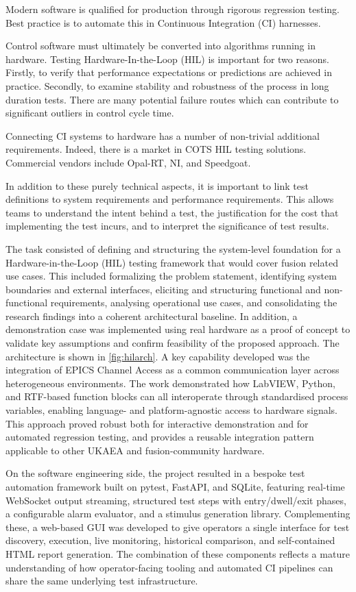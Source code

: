 \documentclass[preprint]{elsarticle}
\begin{document}
Modern software is qualified for production through rigorous regression testing.
Best practice is to automate this in Continuous Integration (CI) harnesses.

Control software must ultimately be converted into algorithms running in hardware.
Testing Hardware-In-the-Loop (HIL) is important for two reasons.  Firstly, to 
verify that performance expectations or predictions are achieved in practice.
Secondly, to examine stability and robustness of the process in long duration tests.
There are many potential failure routes which can contribute to significant outliers
in control cycle time.

Connecting CI systems to hardware has a number of non-trivial additional 
requirements.  Indeed, there is a market in COTS HIL testing solutions.  
Commercial vendors include Opal-RT, NI, and Speedgoat.

In addition to these purely technical aspects, it is important to link 
test definitions to system requirements and performance requirements.
This allows teams to understand the intent behind a test, the
justification for the cost that implementing the test incurs,
and to interpret the significance of test results.

The task consisted of defining and structuring the system-level foundation for a Hardware-in-the-Loop (HIL) testing framework that would cover fusion related use cases. This included formalizing the problem statement, identifying system boundaries and external interfaces, eliciting and structuring functional and non-functional requirements, analysing operational use cases, and consolidating the research findings into a coherent architectural baseline. In addition, a demonstration case was implemented using real hardware as a proof of concept to validate key assumptions and confirm feasibility of the proposed approach. The architecture is shown in \ref{fig:hilarch}.
A key capability developed was the integration of EPICS Channel Access as a common communication layer across heterogeneous environments. The work demonstrated how LabVIEW, Python, and RTF-based function blocks can all interoperate through standardised process variables, enabling language- and platform-agnostic access to hardware signals. This approach proved robust both for interactive demonstration and for automated regression testing, and provides a reusable integration pattern applicable to other UKAEA and fusion-community hardware.

On the software engineering side, the project resulted in a bespoke test automation framework built on pytest, FastAPI, and SQLite, featuring real-time WebSocket output streaming, structured test steps with entry/dwell/exit phases, a configurable alarm evaluator, and a stimulus generation library. Complementing these, a web-based GUI was developed to give operators a single interface for test discovery, execution, live monitoring, historical comparison, and self-contained HTML report generation. The combination of these components reflects a mature understanding of how operator-facing tooling and automated CI pipelines can share the same underlying test infrastructure.
\end{document}
